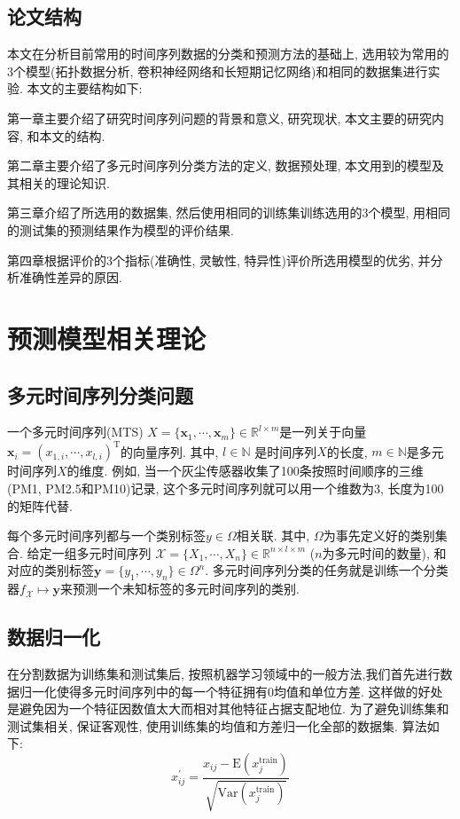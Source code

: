\documentclass[12pt]{ctexart}
\begin{document}
\subsection{论文结构}

本文在分析目前常用的时间序列数据的分类和预测方法的基础上, 选用较为常用的3个模型(拓扑数据分析, 卷积神经网络和长短期记忆网络)和相同的数据集进行实验. 本文的主要结构如下:

第一章主要介绍了研究时间序列问题的背景和意义, 研究现状, 本文主要的研究内容, 和本文的结构.

第二章主要介绍了多元时间序列分类方法的定义, 数据预处理, 本文用到的模型及其相关的理论知识.

第三章介绍了所选用的数据集, 然后使用相同的训练集训练选用的3个模型, 用相同的测试集的预测结果作为模型的评价结果.

第四章根据评价的3个指标(准确性, 灵敏性, 特异性)评价所选用模型的优劣, 并分析准确性差异的原因.


\newpage
\section{预测模型相关理论}
\subsection{多元时间序列分类问题} \label{lb1}
一个多元时间序列(MTS) $X=\{\bm{x}_{1},\cdots,\bm{x}_{m}\}\in \mathbb{R}^{l × m}$是一列关于向量$\bm{x}_{i}=(x_{1,i},\cdots,x_{l,i})^{\mathrm{T}}$的向量序列. 其中, $l\in \mathbb{N}$ 是时间序列$X$的长度, $m\in \mathbb{N}$是多元时间序列$X$的维度. 例如, 当一个灰尘传感器收集了100条按照时间顺序的三维(PM1, PM2.5和PM10)记录, 这个多元时间序列就可以用一个维数为3, 长度为100的矩阵代替. 

每个多元时间序列都与一个类别标签$y\in \Omega$相关联. 其中, $\Omega$为事先定义好的类别集合. 给定一组多元时间序列
$\mathcal{X}=\{X_{1},\cdots,X_{n}\}\in \mathbb{R}^{n × l × m}$
($n$为多元时间的数量), 和对应的类别标签$\bm{y}=\{y_{1},\cdots,y_{n}\}\in \Omega^{n}$. 多元时间序列分类的任务就是训练一个分类器$f_{\mathcal{X}}\mapsto \bm{y}$来预测一个未知标签的多元时间序列的类别\cite{ref12}.
\subsection{数据归一化}\label{lb2}
在分割数据为训练集和测试集后, 按照机器学习领域中的一般方法,我们首先进行数据归一化使得多元时间序列中的每一个特征拥有0均值和单位方差. 这样做的好处是避免因为一个特征因数值太大而相对其他特征占据支配地位. 为了避免训练集和测试集相关, 保证客观性, 使用训练集的均值和方差归一化全部的数据集. 算法如下:
$$x_{ij}^{'}=\frac{x_{ij}-\mathrm{E}(x_{j}^{\mathrm{train}})}{\sqrt{\mathrm{Var}(x_{j}^{\mathrm{train}})}}$$
\end{document}
